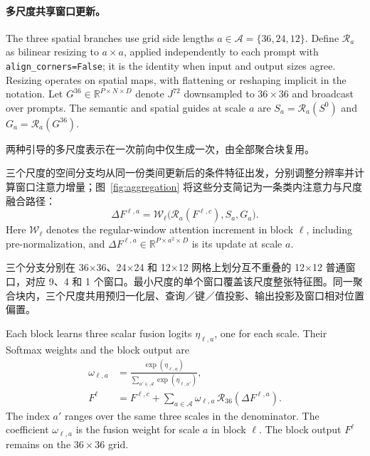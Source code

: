 \paragraph{多尺度共享窗口更新。}
The three spatial branches use grid side lengths $a\in\mathcal A=\{36,24,12\}$. Define $\mathcal R_a$ as bilinear resizing to $a\times a$, applied independently to each prompt with \texttt{align\_corners=False}; it is the identity when input and output sizes agree. Resizing operates on spatial maps, with flattening or reshaping implicit in the notation. Let $G^{36}\in\mathbb R^{P\times N\times D}$ denote $J^{72}$ downsampled to $36\times36$ and broadcast over prompts. The semantic and spatial guides at scale $a$ are $S_a=\mathcal R_a(S^0)$ and $G_a=\mathcal R_a(G^{36})$.

两种引导的多尺度表示在一次前向中仅生成一次，由全部聚合块复用。

三个尺度的空间分支均从同一份类间更新后的条件特征出发，分别调整分辨率并计算窗口注意力增量；图~\ref{fig:aggregation} 将这些分支简记为一条类内注意力与尺度融合路径：
\begin{equation}
 \Delta F^{\ell,a}=\mathcal W_\ell\bigl(\mathcal R_a(F^{\ell,c}),S_a,G_a\bigr).
 \label{eq:multiscale_window_update}
\end{equation}
Here $\mathcal W_\ell$ denotes the regular-window attention increment in block $\ell$, including pre-normalization, and $\Delta F^{\ell,a}\in\mathbb R^{P\times a^2\times D}$ is its update at scale $a$.

三个分支分别在 36×36、24×24 和 12×12 网格上划分互不重叠的 12×12 普通窗口，对应 9、4 和 1 个窗口。最小尺度的单个窗口覆盖该尺度整张特征图。同一聚合块内，三个尺度共用预归一化层、查询／键／值投影、输出投影及窗口相对位置偏置。

Each block learns three scalar fusion logits $\eta_{\ell,a}$, one for each scale. Their Softmax weights and the block output are
\begin{equation}
\begin{aligned}
 \omega_{\ell,a}&=\frac{\exp(\eta_{\ell,a})}
 {\sum_{a'\in\mathcal A}\exp(\eta_{\ell,a'})},\\
 F^\ell&=F^{\ell,c}+\sum_{a\in\mathcal A}
 \omega_{\ell,a}\,\mathcal R_{36}(\Delta F^{\ell,a}).
\end{aligned}
\label{eq:scale_fusion}
\end{equation}
The index $a'$ ranges over the same three scales in the denominator. The coefficient $\omega_{\ell,a}$ is the fusion weight for scale $a$ in block $\ell$. The block output $F^\ell$ remains on the $36\times36$ grid.

